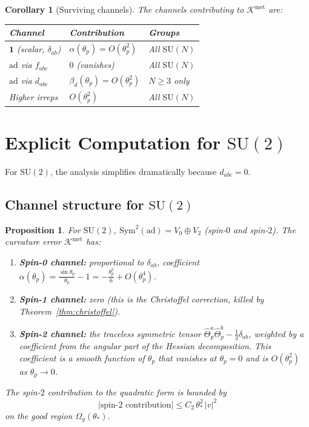 \documentclass[11pt,a4paper]{article}
\theoremstyle{plain}
\newtheorem{proposition}[theorem]{Proposition}
\newtheorem{corollary}[theorem]{Corollary}
\theoremstyle{definition}
\theoremstyle{remark}
\newcommand{\SU}{\mathrm{SU}}
\newcommand{\ad}{\mathrm{ad}}
\newcommand{\Sym}{\mathrm{Sym}}
\newcommand{\abs}[1]{|#1|}
\newcommand{\cK}{\mathcal{K}}
\begin{document}
\begin{corollary}[Surviving channels]\label{cor:surviving}
The channels contributing to $\cK^{\mathrm{met}}$ are:
\begin{center}
\begin{tabular}{lll}
\toprule
Channel & Contribution & Groups \\
\midrule
$\mathbf{1}$ (scalar, $\delta_{ab}$) & $\alpha(\theta_p) = O(\theta_p^2)$ & All $\SU(N)$ \\
$\ad$ via $f_{abc}$ & $0$ (vanishes) & All $\SU(N)$ \\
$\ad$ via $d_{abc}$ & $\beta_d(\theta_p) = O(\theta_p^2)$ & $N \geq 3$ only \\
Higher irreps & $O(\theta_p^2)$ & All $\SU(N)$ \\
\bottomrule
\end{tabular}
\end{center}
\end{corollary}


\section{Explicit Computation for $\SU(2)$}\label{sec:su2}

For $\SU(2)$, the analysis simplifies dramatically because
$d_{abc} = 0$.

\subsection{Channel structure for $\SU(2)$}

\begin{proposition}\label{prop:su2-channels}
For $\SU(2)$, $\Sym^2(\ad) = V_0 \oplus V_2$ (spin-$0$ and
spin-$2$). The curvature error $\cK^{\mathrm{met}}$ has:
\begin{enumerate}[label=(\alph*)]
\item \textbf{Spin-0 channel:} proportional to $\delta_{ab}$,
  coefficient $\alpha(\theta_p) = \frac{\sin\theta_p}{\theta_p}
  - 1 = -\frac{\theta_p^2}{6} + O(\theta_p^4)$.
\item \textbf{Spin-1 channel:} zero (this is the Christoffel
  correction, killed by Theorem~\ref{thm:christoffel}).
\item \textbf{Spin-2 channel:} the traceless symmetric tensor
  $\hat\Theta_p^a\hat\Theta_p^b - \frac{1}{3}\delta_{ab}$,
  weighted by a coefficient from the angular part of the
  Hessian decomposition. This coefficient is a smooth function
  of $\theta_p$ that vanishes at $\theta_p = 0$ and is
  $O(\theta_p^2)$ as $\theta_p \to 0$.
\end{enumerate}
The spin-$2$ contribution to the quadratic form is bounded by
\begin{equation}
\abs{\text{spin-2 contribution}} \leq
C_2\,\theta_*^2\,|v|^2
\end{equation}
on the good region $\Omega_g(\theta_*)$.
\end{proposition}
\end{document}
